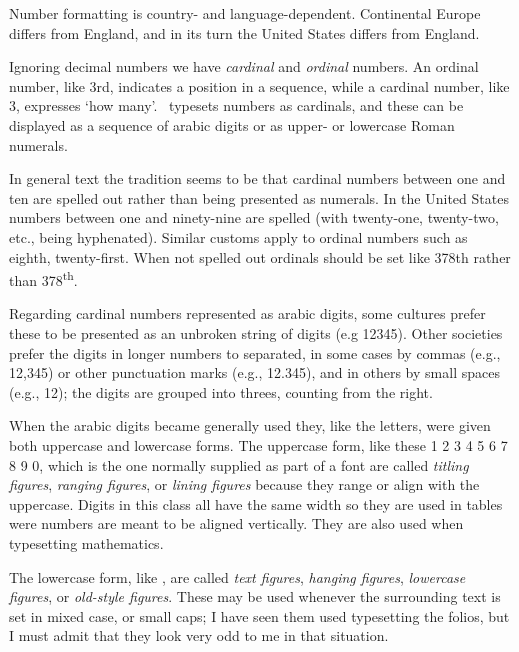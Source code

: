 \documentclass[10pt,letterpaper,extrafontsizes]{memoir}
\begin{document}

    Number formatting is country- and language-dependent. Continental 
Europe differs
from England, and in its turn the United States differs from England.

    Ignoring decimal numbers we have \emph{cardinal} and \emph{ordinal}
numbers. An ordinal number, like 3rd, 
indicates a position in a sequence,
while a cardinal number, like 3, 
expresses `how many'. \ltx\ typesets
numbers as cardinals, and these can be displayed as a sequence of
arabic digits or as upper- or lowercase Roman numerals. 

    In general text the tradition seems to be that cardinal numbers between
one and ten are spelled out rather than being presented as numerals.
In the United States numbers between one and ninety-nine are spelled (with
twenty-one, twenty-two, etc., being hyphenated). Similar customs
apply to ordinal numbers such as eighth, twenty-first. When not spelled out
ordinals should be set like 378th rather than 378\textsuperscript{th}.


    Regarding cardinal numbers represented as arabic digits,
some cultures prefer these to be presented as an unbroken string of
digits (e.g 12345). Other societies prefer the digits in longer 
numbers to separated, in some cases by commas (e.g., 12,345) or other 
punctuation marks (e.g., 12.345), and in others by small spaces (e.g., 12); 
the digits are grouped into threes, counting from the right.

   When the arabic digits became generally used they, like the letters, 
were given both uppercase and lowercase forms. The uppercase form, like these
1 2 3 4 5 6 7 8 9 0, which
is the one normally supplied as part of a font are called 
\emph{titling figures}, 
\emph{ranging figures}, or
\emph{lining figures} because
they range or align with the uppercase.
Digits in this class all
have the same width so they are used in tables were numbers are meant to
be aligned vertically. They are also used when typesetting mathematics.

    The lowercase form, like , are called
\emph{text figures},
\emph{hanging figures},
\emph{lowercase figures}, or
\emph{old-style figures}.
These may be used whenever the surrounding text is set in mixed case, or small caps; I
have seen them used typesetting the folios, but I must admit that they look very odd
to me in that situation.
\end{document}
